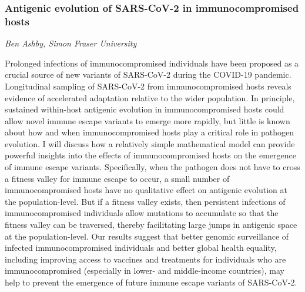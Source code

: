 \subsubsection*{Antigenic evolution of SARS-CoV-2 in immunocompromised hosts}
\textit{Ben Ashby, Simon Fraser University}

Prolonged infections of immunocompromised individuals have been proposed as a
crucial source of new variants of SARS-CoV-2 during the COVID-19 pandemic.
Longitudinal sampling of SARS-CoV-2 from immunocompromised hosts reveals
evidence of accelerated adaptation relative to the wider population. In
principle, sustained within-host antigenic evolution in immunocompromised hosts
could allow novel immune escape variants to emerge more rapidly, but little is
known about how and when immunocompromised hosts play a critical role in
pathogen evolution. I will discuss how a relatively simple mathematical model
can provide powerful insights into the effects of immunocompromised hosts on the
emergence of immune escape variants. Specifically, when the pathogen does not
have to cross a fitness valley for immune escape to occur, a small number of
immunocompromised hosts have no qualitative effect on antigenic evolution at the
population-level. But if a fitness valley exists, then persistent infections of
immunocompromised individuals allow mutations to accumulate so that the fitness
valley can be traversed, thereby facilitating large jumps in antigenic space at
the population-level. Our results suggest that better genomic surveillance of
infected immunocompromised individuals and better global health equality,
including improving access to vaccines and treatments for individuals who are
immunocompromised (especially in lower- and middle-income countries), may help
to prevent the emergence of future immune escape variants of SARS-CoV-2.

